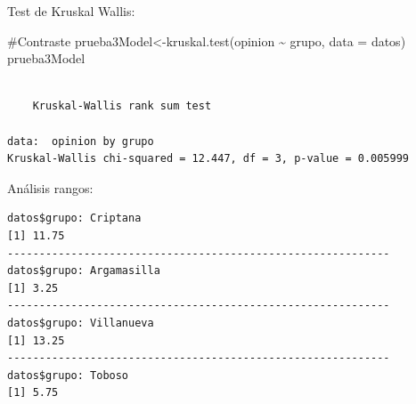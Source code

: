 \documentclass[
  ignorenonframetext,
]{beamer}
\newenvironment{Shaded}{\begin{snugshade}}{\end{snugshade}}
\newcommand{\AttributeTok}[1]{\textcolor[rgb]{0.40,0.45,0.13}{#1}}
\newcommand{\CommentTok}[1]{\textcolor[rgb]{0.37,0.37,0.37}{#1}}
\newcommand{\FunctionTok}[1]{\textcolor[rgb]{0.28,0.35,0.67}{#1}}
\newcommand{\NormalTok}[1]{\textcolor[rgb]{0.00,0.23,0.31}{#1}}
\newcommand{\OtherTok}[1]{\textcolor[rgb]{0.00,0.23,0.31}{#1}}
\newcommand{\SpecialCharTok}[1]{\textcolor[rgb]{0.37,0.37,0.37}{#1}}
\begin{document}
\begin{frame}[fragile]
\begin{block}{Test de Kruskal Wallis:}
\label{test-de-kruskal-wallis}
\begin{Shaded}
\begin{Highlighting}[]
\CommentTok{\#Contraste}
\NormalTok{prueba3Model}\OtherTok{\textless{}{-}}\FunctionTok{kruskal.test}\NormalTok{(opinion }\SpecialCharTok{\textasciitilde{}}\NormalTok{ grupo, }\AttributeTok{data =}\NormalTok{ datos)}
\NormalTok{prueba3Model}
\end{Highlighting}
\end{Shaded}

\begin{verbatim}

    Kruskal-Wallis rank sum test

data:  opinion by grupo
Kruskal-Wallis chi-squared = 12.447, df = 3, p-value = 0.005999
\end{verbatim}

\begin{Shaded}
\end{Shaded}
\end{block}
\end{frame}

\begin{frame}[fragile]
\begin{block}{Análisis rangos:}
\label{anuxe1lisis-rangos}
\begin{Shaded}
\end{Shaded}

\begin{verbatim}
datos$grupo: Criptana
[1] 11.75
------------------------------------------------------------ 
datos$grupo: Argamasilla
[1] 3.25
------------------------------------------------------------ 
datos$grupo: Villanueva
[1] 13.25
------------------------------------------------------------ 
datos$grupo: Toboso
[1] 5.75
\end{verbatim}
\end{block}
\end{frame}
\end{document}
